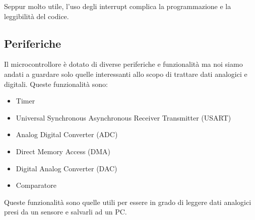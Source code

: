 Seppur molto utile, l'uso degli interrupt complica la programmazione e la leggibilità del codice.


\subsection{Periferiche}

Il microcontrollore è dotato di diverse periferiche e funzionalità ma noi siamo andati a guardare solo quelle interessanti allo scopo di trattare dati analogici e digitali. Queste funzionalità sono:
\begin{itemize}
    \item Timer
    \item Universal Synchronous Asynchronous Receiver Transmitter (USART)
    \item Analog Digital Converter (ADC)
    \item Direct Memory Access (DMA)
    \item Digital Analog Converter (DAC)
    \item Comparatore
\end{itemize}
Queste funzionalità sono quelle utili per essere in grado di leggere dati analogici presi da un sensore e salvarli ad un PC.













